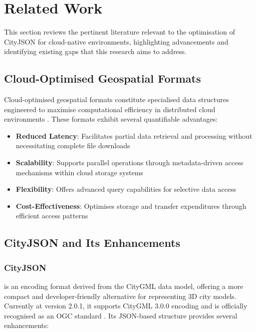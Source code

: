 
\chapter{Related Work}
\label{rw:related_work}
This section reviews the pertinent literature relevant to the optimisation of CityJSON for cloud-native environments, highlighting advancements and identifying existing gaps that this research aims to address.

\section{Cloud-Optimised Geospatial Formats}
\label{rw:cloud_optimised_formats}
Cloud-optimised geospatial formats constitute specialised data structures engineered to maximise computational efficiency in distributed cloud environments \citep{cloud-optimised-formats}. These formats exhibit several quantifiable advantages:

\begin{itemize}
  \item \textbf{Reduced Latency}: Facilitates partial data retrieval and processing without necessitating complete file downloads
  \item \textbf{Scalability}: Supports parallel operations through metadata-driven access mechanisms within cloud storage systems
  \item \textbf{Flexibility}: Offers advanced query capabilities for selective data access
  \item \textbf{Cost-Effectiveness}: Optimises storage and transfer expenditures through efficient access patterns
\end{itemize}

\section{CityJSON and Its Enhancements}
\label{rw:cityjson_enhancements}
\subsection{CityJSON}
\label{rw:cityjson_enhancements:cityjson}
\citet{cityjson} is an encoding format derived from the CityGML \citep{CityGML} data model, offering a more compact and developer-friendly alternative for representing 3D city models. Currently at version 2.0.1, it supports CityGML 3.0.0 encoding and is officially recognised as an OGC standard \citep{ogc}. Its JSON-based structure provides several enhancements:

